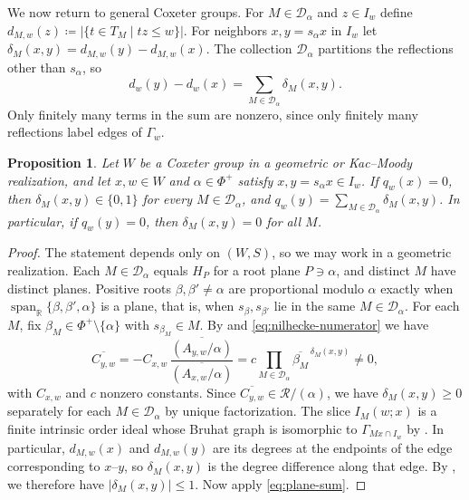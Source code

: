 \documentclass[11pt]{amsart}
\newtheorem{proposition}[proposition]{Proposition}
\theoremstyle{definition}
\theoremstyle{remark}
\numberwithin{equation}{section}
\newcommand{\R}{\mathbb R}
\DeclareMathOperator{\Span}{span}
\begin{document}
We now return to general Coxeter groups. For $M \in \mathcal{D}_\alpha$ and $z \in I_w$ define $d_{M,w}(z)\coloneqq \lvert\{t\in T_M \mid tz\le w\}\rvert$. For neighbors $x, y=s_\alpha x$ in $I_w$ let $\delta_M(x,y)=d_{M,w}(y)-d_{M,w}(x)$. The collection $\mathcal{D}_\alpha$ partitions the reflections other than $s_\alpha$, so
\begin{equation}\label{eq:plane-sum}
 d_w(y)-d_w(x)=\sum_{M\in \mathcal{D}_\alpha}\delta_M(x,y).
\end{equation}
Only finitely many terms in the sum are nonzero, since only finitely many reflections label edges of $\Gamma_w$.

\begin{proposition}\label{prop:plane-comparison}
Let $W$ be a Coxeter group in a geometric or Kac--Moody realization, and let
$x,w\in W$ and $\alpha\in\Phi^+$ satisfy $x,y=s_\alpha x\in I_w$. If $q_w(x)=0$, then $\delta_M(x,y)\in\{0,1\}$ for every
$M \in \mathcal{D}_\alpha$, and $q_w(y)=\sum_{M \in \mathcal{D}_\alpha}\delta_M(x,y)$.
In particular, if $q_w(y)=0$, then $\delta_M(x,y)=0$ for all $M$.
\end{proposition}
\begin{proof}
The statement depends only on $(W,S)$, so we may work
in a geometric realization. Each $M \in \mathcal{D}_\alpha$ equals $H_P$ for a root plane
$P\ni\alpha$, and distinct $M$ have distinct planes. Positive roots $\beta, \beta' \neq \alpha$ are proportional modulo $\alpha$ exactly when $\Span_\R\{\beta, \beta', \alpha\}$ is a plane, that is, when
$s_{\beta},s_{\beta'}$ lie in the same $M \in \mathcal{D}_\alpha$. For each $M$, fix $\beta_M\in\Phi^+\setminus\{\alpha\}$ with $s_{\beta_M}\in M$. By  and
\eqref{eq:nilhecke-numerator} we have
\[
 \overline{C_{y,w}}
 =-C_{x,w}\,\frac{\overline{(A_{y,w}/\alpha)}}{\overline{(A_{x,w}/\alpha)}}
 =c\prod_{M \in \mathcal{D}_\alpha}\overline{\beta_M}^{\,\delta_M(x,y)}
 \ne0,
\]
with $C_{x,w}$ and $c$ nonzero constants. Since $\overline{C_{y,w}} \in \mathcal{R}/(\alpha)$, we have $\delta_M(x,y)\ge0$ separately for each $M \in \mathcal{D}_\alpha$ by unique factorization.
The slice
$I_M(w;x)$ is a finite intrinsic order ideal whose Bruhat graph is isomorphic to $\Gamma_{Mx\cap I_w}$ by . In particular,
$d_{M,w}(x)$ and $d_{M,w}(y)$ are its degrees at the
endpoints of the edge corresponding to $x$--$y$, so
$\delta_M(x,y)$ is the degree difference along that edge. By , we therefore have $\lvert \delta_M(x,y) \rvert \leq 1$. Now apply
\eqref{eq:plane-sum}.
\end{proof}
\end{document}
